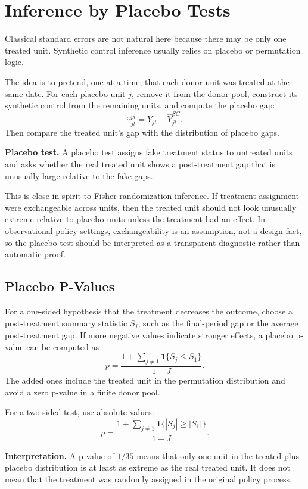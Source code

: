 \section{Inference by Placebo Tests}

Classical standard errors are not natural here because there may be only one treated unit. Synthetic control inference usually relies on placebo or permutation logic.

The idea is to pretend, one at a time, that each donor unit was treated at the same date. For each placebo unit \(j\), remove it from the donor pool, construct its synthetic control from the remaining units, and compute the placebo gap:
\[
\widehat{\tau}^{pl}_{jt}
=
Y_{jt}-\widehat{Y}^{SC}_{jt}.
\]
Then compare the treated unit's gap with the distribution of placebo gaps.

\begin{defN}
\textbf{Placebo test.} A placebo test assigns fake treatment status to untreated units and asks whether the real treated unit shows a post-treatment gap that is unusually large relative to the fake gaps.
\end{defN}

This is close in spirit to Fisher randomization inference. If treatment assignment were exchangeable across units, then the treated unit should not look unusually extreme relative to placebo units unless the treatment had an effect. In observational policy settings, exchangeability is an assumption, not a design fact, so the placebo test should be interpreted as a transparent diagnostic rather than automatic proof.

\subsection{Placebo P-Values}

For a one-sided hypothesis that the treatment decreases the outcome, choose a post-treatment summary statistic \(S_j\), such as the final-period gap or the average post-treatment gap. If more negative values indicate stronger effects, a placebo p-value can be computed as
\[
p
=
\frac{
1+\sum_{j\neq 1}\mathbf{1}\{S_j\leq S_1\}
}{
1+J
}.
\]
The added ones include the treated unit in the permutation distribution and avoid a zero p-value in a finite donor pool.

For a two-sided test, use absolute values:
\[
p
=
\frac{
1+\sum_{j\neq 1}\mathbf{1}\{|S_j|\geq |S_1|\}
}{
1+J
}.
\]

\begin{boxD}
\textbf{Interpretation.} A p-value of \(1/35\) means that only one unit in the treated-plus-placebo distribution is at least as extreme as the real treated unit. It does not mean that the treatment was randomly assigned in the original policy process.
\end{boxD}

